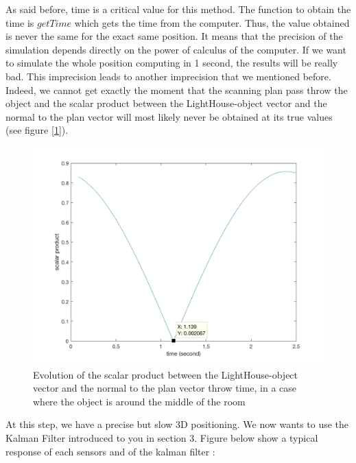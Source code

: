 \documentclass{vldb}
\begin{document}
As said before, time is a critical value for this method. The function to obtain the time is $getTime$ which gets the time from the computer. Thus, the value obtained is never the same for the exact same position. It means that the precision of the simulation depends directly on the power of calculus of the computer. If we want to simulate the whole position computing in 1 second, the results will be really bad. \newline
This imprecision leads to another imprecision that we mentioned before. Indeed, we cannot get exactly the moment that the scanning plan pass throw the object and the scalar product between the LightHouse-object vector and the normal to the plan vector will most likely never be obtained at its true values (see figure [\ref{scal}]).

 \begin{figure}
 \centering
\includegraphics[width=1.0\columnwidth]{Image/scalaire.png}
\caption{Evolution of the scalar product between the LightHouse-object vector and the normal to the plan vector throw time, in a case where the object is around the middle of the room}
\label{scal}
\end{figure}

At this step, we have a precise but slow 3D positioning. We now wants to use the Kalman Filter introduced to you in section 3. Figure below show a typical response of each sensors and of the kalman filter : \\
\end{document}
